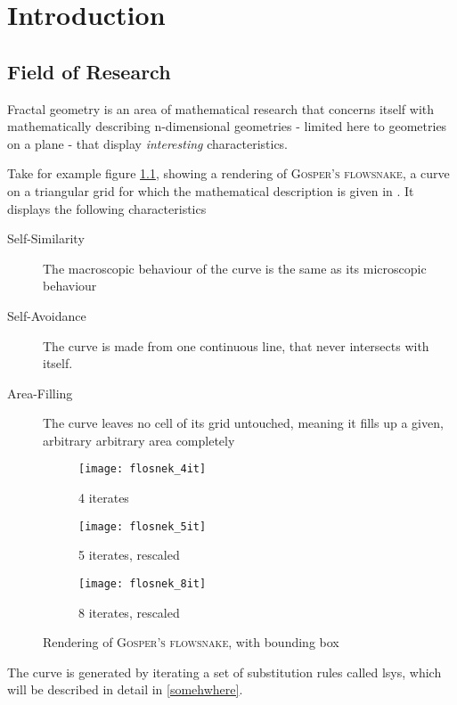 \chapter{Introduction}
\label{cha:Intro}

\section{Field of Research}

Fractal geometry is an area of mathematical research that concerns itself with mathematically describing n-dimensional geometries - limited here to geometries on a plane - that display \textit{interesting} characteristics. 

Take for example figure \ref{fig:flosnek}, showing a rendering of \textsc{Gosper's flowsnake}, a curve on a triangular grid for which the mathematical description is given in \citet{Arndt2016}. It displays the following characteristics

\begin{description}
	\item [Self-Similarity] The macroscopic behaviour of the curve is the same as its microscopic behaviour
	\item [Self-Avoidance] The curve is made from one continuous line, that never intersects with itself.
	\item [Area-Filling] The curve leaves no cell of its grid untouched, meaning it fills up a given, arbitrary arbitrary area completely
\end{description}

\begin{figure}[h]
\centering
\begin{subfigure}{.33\textwidth}
  \centering
  \texttt{[image: flosnek\_4it]}
  \caption{4 iterates}
\end{subfigure}%
\begin{subfigure}{.33\textwidth}
  \centering
  \texttt{[image: flosnek\_5it]}
  \caption{5 iterates, rescaled}
\end{subfigure}%
\begin{subfigure}{.33\textwidth}
  \centering
  \texttt{[image: flosnek\_8it]}
  \caption{8 iterates, rescaled}
\end{subfigure}
\caption{Rendering of \textsc{Gosper's flowsnake}, with \gls{bounding box}}
	\label{fig:flosnek}
\end{figure}

The curve is generated by iterating a set of substitution rules called \gls{lsys}, which will be described in detail in \ref{somehwhere}.

